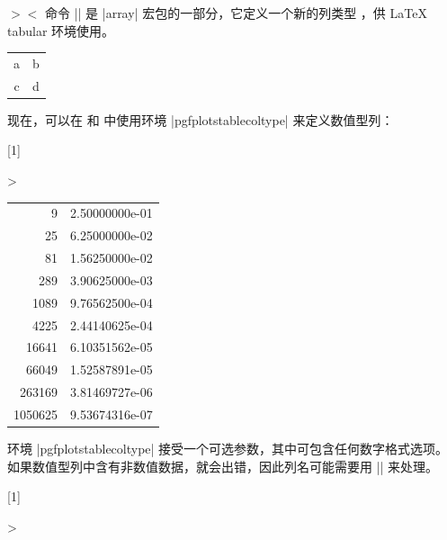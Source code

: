 \documentclass[a4paper,doc2]{ltxdoc}
\begin{document}
\begin{command}{\newcolumntype{}$>$$<$
}
    命令 |\newcolumntype| 是 |array| 宏包的一部分，它定义一个新的列类型
    ，供 \LaTeX{} tabular 环境使用。
\begin{codeexample}
\usepackage{array}
\end{codeexample}

\begin{codeexample}[]
\begin{tabular}{dl}
a & b \\
c & d \\
\end{tabular}
\end{codeexample}

    现在，可以在  和  中使用环境
    |pgfplotstablecoltype| 来定义数值型列：
\begin{codeexample}[]
\newcolumntype{L}[1]
    {>{\begin{pgfplotstablecoltype}[#1]}r<{\end{pgfplotstablecoltype}}}

\begin{tabular}{L{int detect}L{sci,sci subscript,sci zerofill}}
9      & 2.50000000e-01\\
25     & 6.25000000e-02\\
81     & 1.56250000e-02\\
289    & 3.90625000e-03\\
1089   & 9.76562500e-04\\
4225   & 2.44140625e-04\\
16641  & 6.10351562e-05\\
66049  & 1.52587891e-05\\
263169 & 3.81469727e-06\\
1050625& 9.53674316e-07\\
\end{tabular}
\end{codeexample}
    \noindent 环境 |pgfplotstablecoltype| 接受一个可选参数，其中可包含任何数字格式选项。
    如果数值型列中含有非数值数据，就会出错，因此列名可能需要用 |\multicolumn| 来处理。
\begin{codeexample}[]
\newcolumntype{L}[1]
    {>{\begin{pgfplotstablecoltype}[#1]}r<{\end{pgfplotstablecoltype}}}


\end{codeexample}
\end{command}
\end{document}
